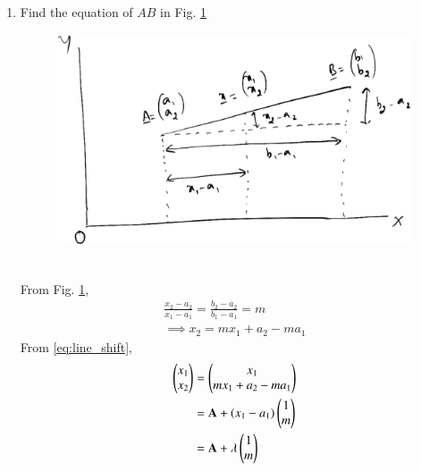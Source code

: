 \documentclass[journal,12pt,twocolumn]{IEEEtran}
\renewcommand\thesection{\arabic{section}}
\begin{document}
\begin{enumerate}[label=\thesection.\arabic*
,ref=\thesection.\theenumi]
\item Find the equation of $AB$ in Fig. \ref{fig:line_nhomog}
\begin{figure}
\centering
\includegraphics[width=\columnwidth]{./figs/line_nhomog.eps}
\caption{}
\label{fig:line_nhomog}
\end{figure}
\\
\solution 
From Fig. \ref{fig:line_nhomog}, 
%
\begin{align}
\frac{x_2-a_2}{x_1-a_1} = \frac{b_2-a_2}{b_1-a_1} = m
\\
\implies x_2 = m x_1 + a_2-ma_1
\label{eq:line_shift}
\end{align}
%
From \eqref{eq:line_shift},
\begin{align}
\begin{pmatrix}x_1 \\ x_2\end{pmatrix} &= 
\begin{pmatrix}x_1 \\   m x_1 + a_2-ma_1
\end{pmatrix} 
\\
&=\mathbf{A} + \left(x_1-a_1\right)  \begin{pmatrix}1 \\ m\end{pmatrix}
\\
&=\mathbf{A} + \lambda  \begin{pmatrix}1 \\ m\end{pmatrix}
\label{eq:nhomog}
\end{align}


\end{enumerate}
\end{document}
